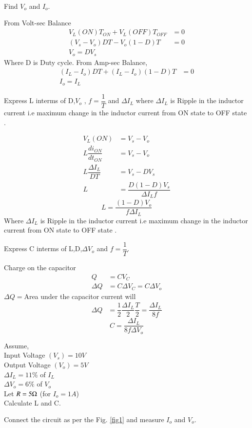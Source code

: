 \documentclass[journal,12pt,twocolumn]{IEEEtran}
\begin{document}
\begin{problem}
Find $V_{o}$ and $I_{o}$.
\end{problem} 
\solution
From Volt-sec Balance
 \begin{align*}
  V_{L}(ON)T_{ON} + V_{L}(OFF)T_{OFF}&= 0 \\
  (V_{s} - V_{o})D T-V_{o}(1-D)T &= 0 \\
  V_{o} = DV_{s}
\end{align*} 
Where D is Duty cycle.
From Amp-sec Balance,
\begin{align*}
  (I_{L} - I_{o})D T+(I_{L}-I_{o})(1-D)T &= 0 \\
  I_{o} = I_{L}
\end{align*} 
\begin{problem}
Express L interms of D,$V_{o}$ , $f=\dfrac{1}{T}$ and $\Delta I_{L}$ where $\Delta I_{L}$ is Ripple in the inductor  current i.e maximum change in the inductor current from ON state to OFF state . 
\end{problem}
\solution
\begin{align*}
  V_{L}(ON) &= V_{s} - V_{o}\\
  L \dfrac{di_{ON}}{dt_{ON}} &=V_{s} - V_{o}\\
  L \dfrac{\Delta I_{L}}{DT} &=V_{s} - DV_{s}\\
  L &=\dfrac{D(1-D)V_{s}}{\Delta I_{L}f}
  \end{align*}
\begin{equation}
\label{eq:eq1}
L=\dfrac{(1-D)V_{o}}{f\Delta I_{L}}
\end{equation}
Where $\Delta I_{L}$ is Ripple in the inductor  current i.e maximum change in the inductor current from ON state to OFF state . 
\begin{problem}
Express C interms of L,D,$\Delta V_{o}$ and $f=\dfrac{1}{T}$.
\end{problem}
\solution
Charge on the capacitor 
\begin{align*}
  Q&=CV_{C}\\
  \Delta Q &= C\Delta V_{C} =C\Delta V_{o}
\end{align*}
$\Delta Q=$Area under the capacitor current will
\begin{align*}
 \Delta Q &= \dfrac{1}{2}  \dfrac{\Delta I_{L}}{2} \dfrac{T}{2} =  \dfrac{\Delta I_{L}}{8f}
\end{align*}
\begin{equation}
\label{eq:eq2}
C=\dfrac{\Delta I_{L}}{8f\Delta V_{o}}  
\end{equation}
\begin{problem}
Assume,\\
Input Voltage $(V_{s}) = 10V$\\
Output Voltage $(V_{o}) = 5V$\\
$\Delta I_{L} = 11 \% $ of $I_{L}$\\
$\Delta V_{o} = 6 \% $ of $V_{o}$ \\
Let $R = 5 \ohm $ (for $I_{o}=1A$)\\
Calculate L and C.
\end{problem} 
\begin{problem}
Connect the circuit as per the Fig. \ref{fig1} and measure $I_{o}$ and $V_{o}$.
\end{problem}
\end{document}
